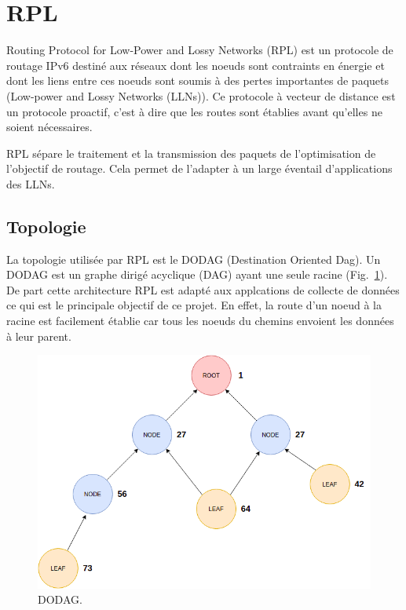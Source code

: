 \newpage
\section{RPL}\label{sec:state-rpl}
\renewcommand{\rightmark}{RPL}

Routing Protocol for Low-Power and Lossy Networks (RPL) est un protocole de routage IPv6 destiné aux réseaux dont les noeuds sont contraints en énergie et dont les liens entre ces noeuds sont soumis à des pertes importantes de paquets (Low-power and Lossy Networks (LLNs)).
Ce protocole à vecteur de distance est un protocole proactif, c'est à dire que les routes sont établies avant qu'elles ne soient nécessaires.

RPL sépare le traitement et la transmission des paquets de l'optimisation de l'objectif de routage. Cela permet de l'adapter à un large éventail d'applications des LLNs.

\subsection*{Topologie}
    La topologie utilisée par RPL est le DODAG (Destination Oriented Dag). Un DODAG est un graphe   dirigé acyclique (DAG) ayant une seule racine (Fig.~\ref{fig:state-dodag}). De part cette architecture RPL est adapté aux applcations de collecte de données ce qui est le principale objectif de ce projet. En effet, la route d'un noeud à la racine est facilement établie car tous les noeuds du chemins envoient les données à leur parent.

    \begin{figure}[H]
        \centering
        \includegraphics[scale=0.45]{res/dodag.drawio.png}
        \caption{DODAG.}
        \label{fig:state-dodag}
    \end{figure}


